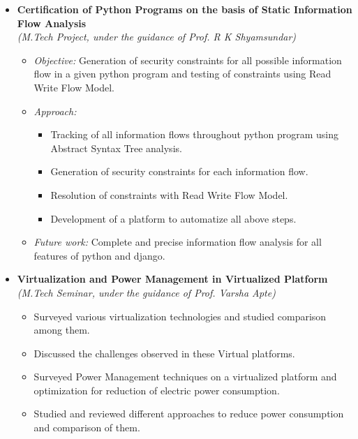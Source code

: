 \begin{itemize}
\item \textbf{Certification of Python Programs on the basis of Static Information Flow Analysis} \\
      \emph{(M.Tech Project, under the guidance of Prof. R K Shyamsundar)}  \\[-0.6cm]
      \begin{itemize}
  \item \textit{Objective:} Generation of security constraints for all possible information flow in a given python program and testing of constraints using Read Write Flow Model.\\[-0.5cm]
 	  	  
  \item \textit{Approach:} \\[-0.5cm]
   \begin{itemize}
 \item Tracking of all information flows throughout python program using Abstract Syntax Tree analysis.
 \item Generation of security constraints for each information flow.
 \item Resolution of constraints with Read Write Flow Model.
 \item Development of a platform to automatize all above steps. \\[-0.5cm]
   \end{itemize}
  \item \textit{Future work:} 
  Complete and precise information flow analysis for all features of python and django.\\[-0.5cm]
  	        \end{itemize}
\item \textbf{Virtualization and Power Management in Virtualized Platform} \\
\emph{(M.Tech Seminar, under the guidance of Prof. Varsha Apte)} \\[-0.6cm]
\begin{itemize}
	\item Surveyed various virtualization technologies and studied comparison among them. \\[-0.5cm]
	\item Discussed the challenges observed in these Virtual platforms. \\[-0.5cm]
	\item Surveyed Power Management techniques on a virtualized platform and optimization for reduction of electric power consumption. \\[-0.5cm]
	\item Studied and reviewed different approaches to reduce power consumption and comparison of them.
\end{itemize}

\end{itemize}
